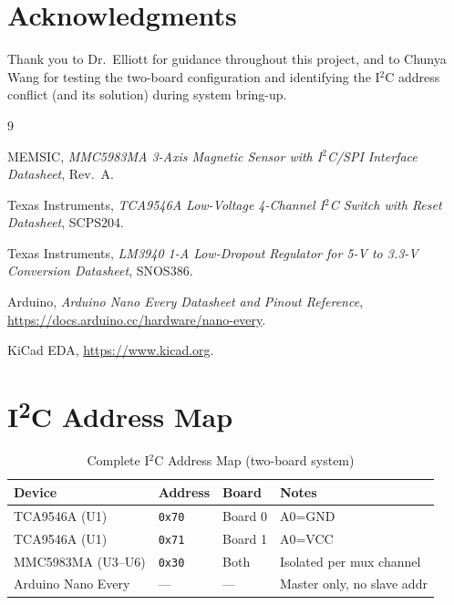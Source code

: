 \documentclass[12pt]{article}
\begin{document}
\newpage
\section*{Acknowledgments}

Thank you to Dr.\ Elliott for guidance throughout this project, and to
Chunya Wang for testing the two-board configuration and identifying
the I$^2$C address conflict (and its solution) during system bring-up.

\newpage
\begin{thebibliography}{9}

  MEMSIC, \textit{MMC5983MA 3-Axis Magnetic Sensor with I$^2$C/SPI Interface
  Datasheet}, Rev.\ A.

  Texas Instruments, \textit{TCA9546A Low-Voltage 4-Channel I$^2$C Switch
  with Reset Datasheet}, SCPS204.

  Texas Instruments, \textit{LM3940 1-A Low-Dropout Regulator for 5-V to
  3.3-V Conversion Datasheet}, SNOS386.

  Arduino, \textit{Arduino Nano Every Datasheet and Pinout Reference},
  \url{https://docs.arduino.cc/hardware/nano-every}.

  KiCad EDA, \url{https://www.kicad.org}.

\end{thebibliography}

\appendix

\section{I\textsuperscript{2}C Address Map}

\begin{table}[H]
  \centering
  \caption{Complete I$^2$C Address Map (two-board system)}
  \begin{tabular}{llll}
    \toprule
    \textbf{Device} & \textbf{Address} & \textbf{Board} &
    \textbf{Notes} \\
    \midrule
    TCA9546A (U1) & \texttt{0x70} & Board 0 & A0=GND \\
    TCA9546A (U1) & \texttt{0x71} & Board 1 & A0=VCC \\
    MMC5983MA (U3--U6) & \texttt{0x30} & Both & Isolated per mux channel \\
    Arduino Nano Every & --- & --- & Master only, no slave addr \\
    \bottomrule
  \end{tabular}
  \label{tab:i2c_map}
\end{table}
\end{document}
